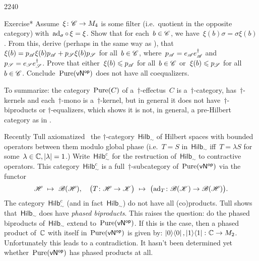 \begin{parsec}{2240}
\begin{point}{70}{Exercise*}
Assume~$\xi \colon \mathscr{C} \to M_4$
    is some filter (i.e.~quotient in the opposite category)
    with~$\mathrm{ad}_\sigma \mathop{\circ} \xi = \xi$.
Show that for each~$b \in \mathscr{C}$,
        we have~$\xi(b) \sigma = \sigma \xi(b)$.
    From this, derive (perhaps in the same way as \cite{bags}),
    that~$\xi(b) = p_{\mathscr{A}} \xi(b) p_{\mathscr{A}}+ p_{\mathscr{S}} \xi(b) p_{\mathscr{S}}$
        for all~$b\in \mathscr{C}$,
        where~$p_{\mathscr{A}} = e_{\mathscr{A}} e_{\mathscr{A}}^\dagger$
        and~$p_{\mathscr{S}} = e_{\mathscr{S}} e_{\mathscr{S}}^\dagger$.
Prove that either~$\xi(b) \leqslant p_{\mathscr{A}}$ for all~$b\in \mathscr{C}$
    or~$\xi(b) \leqslant p_{\mathscr{S}}$ for all~$b \in \mathscr{C}$.
Conclude~$\operatorname{Pure}({\mathsf{vN}}{^{\mathsf{op}}})$ does not have all coequalizers.
\end{point}
\begin{point}{80}%
To summarize:
    the category~$\operatorname{Pure}(C)$
    of a~$\dagger$-effectus~$C$
    is a~$\dagger$-category,
    has~$\dagger$-kernels
    and each~$\dagger$-mono is a~$\dagger$-kernel,
    but in general it does not have~$\dagger$-biproducts or
        $\dagger$-equalizers,
        which shows it is not, in general,
        a pre-Hilbert category as in \cite[3.7.1]{heunenphd}.
\end{point}
\begin{point}{81}%
Recently Tull axiomatized~\cite{tull}
    the $\dagger$-category~$\mathsf{Hilb}_\sim$
        of Hilbert spaces with bounded operators between
        them modulo global phase (i.e.~$T=S$ in~$\mathsf{Hilb}_\sim$
        iff~$T = \lambda S$ for some~$\lambda \in \mathbb{C}, |\lambda|=1$.)
Write~$\mathsf{Hilb}^c_\sim$
    for the restruction of~$\mathsf{Hilb}_\sim$
    to contractive operators.
This category~$\mathsf{Hilb}^c_{\sim}$
    is a full~$\dagger$-subcategory of~$\operatorname{Pure}({\mathsf{vN}}{^{\mathsf{op}}})$
    via the functor
\begin{equation*}
    \mathscr{H} \ \mapsto \ \mathscr{B}(\mathscr{H}),  \quad
    \bigl(T\colon \mathscr{H} \to \mathscr{K}\bigr)
        \ \mapsto \ \bigl(\mathrm{ad}_T \colon \mathscr{B}(\mathscr{K}) \to \mathscr{B}(\mathscr{H})\bigr).
\end{equation*}
The category~$\mathsf{Hilb}^c_\sim$
    (and in fact~$\mathsf{Hilb}_\sim$)
    do not have all (co)products.
Tull shows that~$\mathsf{Hilb}_\sim$ does have
    \emph{phased biproducts}. \cite{tull,tull2018quotient}
This raises the question: do the phased biproducts
    of~$\mathsf{Hilb}_\sim$ extend to~$\operatorname{Pure}({\mathsf{vN}}{^{\mathsf{op}}})$.
If this is the case, then a
    phased product of~$\mathbb{C}$ with itself in~$\operatorname{Pure}({\mathsf{vN}}{^{\mathsf{op}}})$
    is given by: $\left|0\right>\!\left<0\right|, \left|1\right>\!\left<1\right|\colon \mathbb{C}  \to M_2$.
Unfortunately this leads to a contradiction.
It hasn't been determined yet whether~$\operatorname{Pure}({\mathsf{vN}}{^{\mathsf{op}}})$
    has phased products at all.
\end{point}
\end{parsec}

